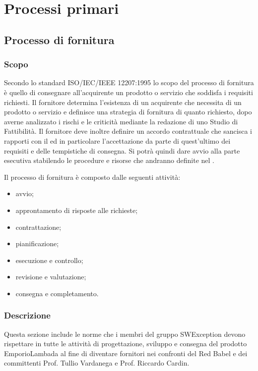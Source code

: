 \section{Processi primari}

\subsection{Processo di fornitura}
\label{_processoDiFornitura}
\subsubsection{Scopo}
Secondo lo standard ISO/IEC/IEEE 12207:1995 lo scopo del processo di fornitura è quello di consegnare all'acquirente un prodotto o servizio che soddisfa i requisiti richiesti. Il fornitore determina l'esistenza di un acquirente che necessita di un prodotto o servizio e definisce una strategia di fornitura di quanto richiesto, dopo averne analizzato i rischi e le criticità mediante la redazione di uno Studio di Fattibilità.
Il fornitore deve inoltre definire un accordo contrattuale che sancisca i rapporti con il  ed in particolare l'accettazione da parte di quest'ultimo dei requisiti e delle tempistiche di consegna. Si potrà quindi dare avvio alla parte esecutiva stabilendo le procedure e risorse che andranno definite nel .

Il processo di fornitura è composto dalle seguenti attività:
\begin{itemize}
  \item avvio;
  \item approntamento di risposte alle richieste;
  \item contrattazione;
  \item pianificazione;
  \item esecuzione e controllo;
  \item revisione e valutazione;
  \item consegna e completamento.
\end{itemize}

\subsubsection{Descrizione}
Questa sezione include le norme che i membri del gruppo SWException devono rispettare in tutte le attività di progettazione, sviluppo e consegna del prodotto EmporioLambada al fine di diventare fornitori nei confronti del  Red Babel e dei committenti Prof. Tullio Vardanega e Prof. Riccardo Cardin.
